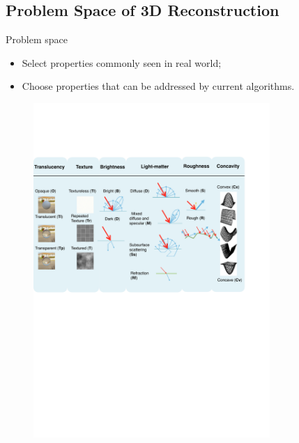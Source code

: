 \documentclass[10pt]{beamer}
\begin{document}
\subsection{Problem Space of 3D Reconstruction}
\begin{frame}{Problem space}

\begin{exampleblock}{}
\begin{itemize}
\item Select properties commonly seen in real world;
\item Choose properties that can be addressed by current algorithms.
\end{itemize}
\end{exampleblock}


\begin{figure}
\includegraphics[width=0.8\textwidth]{prob_space/obj_class}
\end{figure}

\end{frame}
\end{document}
